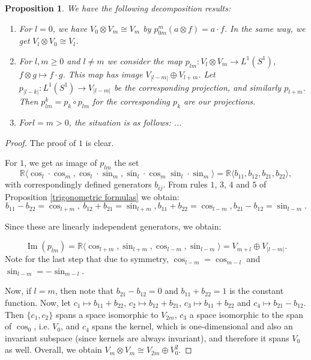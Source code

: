 \documentclass[12pt, a4paper]{article}
\theoremstyle{plain}
\newtheorem{pro}{Proposition}[section]
\theoremstyle{definition}
\theoremstyle{remark}
\newcommand{\R}{\mathds{R}}
\DeclareMathOperator{\im}{Im}
\begin{document}
\begin{pro}
We have the following decomposition results:
\begin{enumerate}
\item For $l=0$, we have $V_0 \otimes V_m \cong V_m$ by $p_{0m}^{m}(a \otimes f) = a \cdot f$. In the same way, we get $V_l \otimes V_0 \cong V_l$.
\item For $l, m \geq 0$ and $l \neq m$ we consider the map $p_{lm}: V_l \otimes V_m \to L^1(S^1)$, $f \otimes g \mapsto f \cdot g$. This map has image $V_{|l - m|} \oplus V_{l+m}$. Let $p_{|l-k|}: L^1(S^1) \to V_{|l-m|}$ be the corresponding projection, and similarly $p_{l+m}$. Then $p_{lm}^{k} = p_k \circ p_{lm}$ for the corresponding $p_k$ are our projections.
\item $For l = m > 0$, the situation is as follows: ...
\end{enumerate}
\end{pro}

\begin{proof}
The proof of $1$ is clear.

For $1$, we get as image of $p_{lm}$ the set
\begin{equation*}
\R\langle \cos_l \cdot \cos_m, \cos_l \cdot \sin_m, \sin_l \cdot \cos_m \sin_l \cdot \sin_m\rangle = \R \langle b_{11}, b_{12}, b_{21}, b_{22}\rangle,
\end{equation*}
with correspondingly defined generators $b_{ij}$. From rules $1$, $3$, $4$ and $5$ of Proposition \ref{trigonometric formulas} we obtain:
\begin{equation*}
b_{11} - b_{22} = \cos_{l+m}, \ b_{12} + b_{21} = \sin_{l+m}, b_{11} + b_{22} = \cos_{l-m}, b_{21} - b_{12} = \sin_{l-m}.
\end{equation*}

Since these are linearly independent generators, we obtain:

\begin{equation*}
\im(p_{lm}) = \R \langle \cos_{l+m}, \sin_{l+m}, \cos_{l-m}, \sin_{l-m}\rangle = V_{m+l} \oplus V_{|l-m|}.
\end{equation*}
Note for the last step that due to symmetry, $\cos_{l-m} = \cos_{m-l}$ and $\sin_{l-m} = - \sin_{m-l}$.

Now, if $l = m$, then note that $b_{21} - b_{12} = 0$ and $b_{11} + b_{22} = 1$ is the constant function. Now, let $c_1 \mapsto b_{11} + b_{22}$, $c_{2} \mapsto b_{12} + b_{21}$, $c_3 \mapsto b_{11} + b_{22}$ and $c_4 \mapsto b_{21} - b_{12}$. Then $\{c_1, c_2\}$ spans a space isomorphic to $V_{2m}$, $c_3$ a space isomorphic to the span of $\cos_0$, i.e. $V_0$, and $c_4$ spans the kernel, which is one-dimensional and also an invariant subspace (since kernels are always invariant), and therefore it spans $V_0$ as well. Overall, we obtain $V_m \otimes V_m \cong V_{2m} \oplus V_0^2$.
\end{proof}
\end{document}
